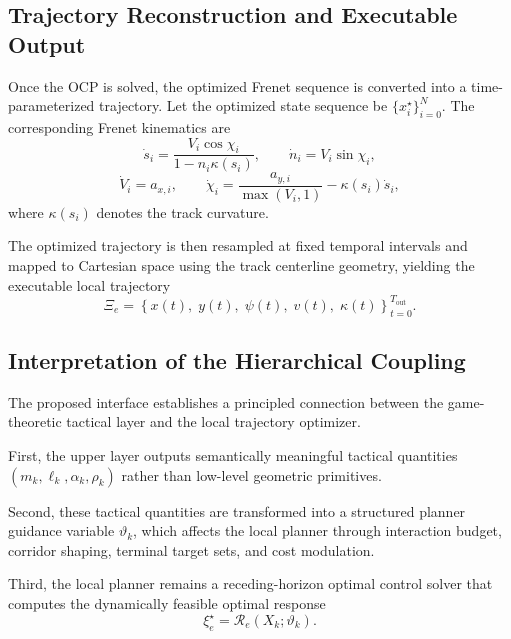 \documentclass[final ,3p, times]{elsarticle}
\begin{document}
\subsection{Trajectory Reconstruction and Executable Output}
\label{subsec:trajectory_reconstruction_final}

Once the OCP is solved, the optimized Frenet sequence is converted into a time-parameterized trajectory. Let the optimized state sequence be $\{x_i^\star\}_{i=0}^{N}$. The corresponding Frenet kinematics are
\begin{equation}
\dot s_i = \frac{V_i \cos\chi_i}{1-n_i\kappa(s_i)},
\qquad
\dot n_i = V_i \sin\chi_i,
\label{eq:frenet_reconstruction_final_1}
\end{equation}
\begin{equation}
\dot V_i = a_{x,i},
\qquad
\dot \chi_i
=
\frac{a_{y,i}}{\max(V_i,1)}
-
\kappa(s_i)\dot s_i,
\label{eq:frenet_reconstruction_final_2}
\end{equation}
where $\kappa(s_i)$ denotes the track curvature.


The optimized trajectory is then resampled at fixed temporal intervals and mapped to Cartesian space using the track centerline geometry, yielding the executable local trajectory
\begin{equation}
\Xi_e =
\left\{
x(t),\;
y(t),\;
\psi(t),\;
v(t),\;
\kappa(t)
\right\}_{t=0}^{T_{\mathrm{out}}}.
\label{eq:final_trajectory_output}
\end{equation}

\subsection{Interpretation of the Hierarchical Coupling}
\label{subsec:interpretation_hierarchical_coupling}

The proposed interface establishes a principled connection between the game-theoretic tactical layer and the local trajectory optimizer.

First, the upper layer outputs semantically meaningful tactical quantities $(m_k,\ell_k,\alpha_k,\rho_k)$ rather than low-level geometric primitives.

Second, these tactical quantities are transformed into a structured planner guidance variable $\vartheta_k$, which affects the local planner through interaction budget, corridor shaping, terminal target sets, and cost modulation.

Third, the local planner remains a receding-horizon optimal control solver that computes the dynamically feasible optimal response
\begin{equation}
\xi_e^\star = \mathcal{R}_e(X_k;\vartheta_k).
\label{eq:lower_response_again}
\end{equation}
\end{document}
